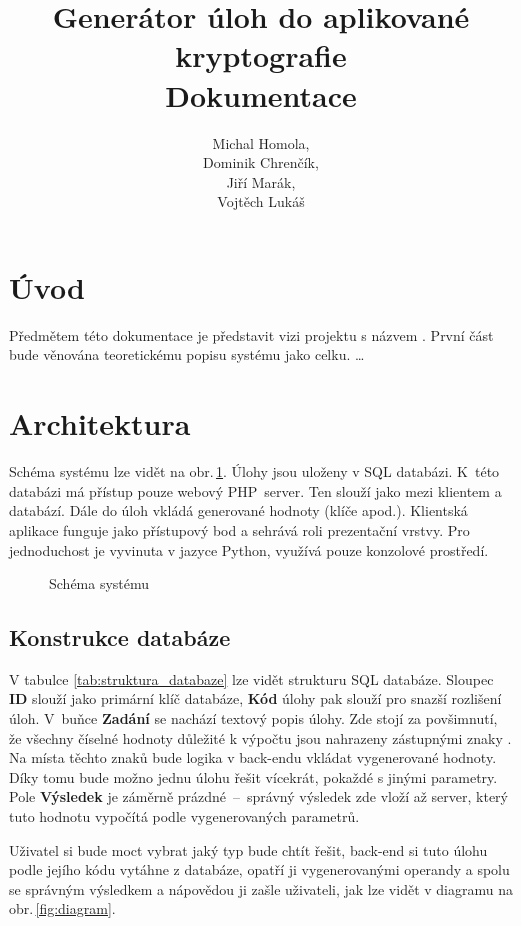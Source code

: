 \documentclass[titlepage]{article}
\title{Generátor úloh do aplikované kryptografie\\Dokumentace}
\author{Michal Homola,\\Dominik Chrenčík,\\Jiří Marák,\\Vojtěch Lukáš}
\begin{document}
\maketitle

\tableofcontents

\section*{Úvod}
Předmětem této dokumentace je představit vizi projektu s názvem . První část bude věnována teoretickému popisu systému jako celku. \dots

\section{Architektura}
Schéma systému lze vidět na obr.\,\ref{fig:sys}. Úlohy jsou uloženy v SQL databázi. K~této databázi má přístup pouze webový PHP~server. Ten slouží jako  mezi klientem a databází. Dále do úloh vkládá generované hodnoty (klíče apod.).
Klientská aplikace funguje jako přístupový bod a sehrává roli prezentační vrstvy. Pro jednoduchost je vyvinuta v jazyce Python, využívá pouze konzolové pro\-středí. 
\begin{figure}[h!]
    \centering
        
    \caption{Schéma systému}
    \label{fig:sys}
\end{figure}

\subsection{Konstrukce databáze}
V tabulce \ref{tab:struktura_databaze} lze vidět strukturu SQL databáze. 
Sloupec \textbf{ID} slouží jako primární klíč databáze, \textbf{Kód} úlohy pak slouží pro snazší rozlišení úloh. V~buňce \textbf{Zadání} se nachází textový popis úlohy. Zde stojí za povšimnutí, že všechny číselné hodnoty důležité k výpočtu jsou nahrazeny zástupnými znaky . 
Na místa těchto znaků bude logika v back-endu vkládat vygenerované hodnoty. Díky tomu bude možno jednu úlohu řešit vícekrát, po\-kaž\-dé s jinými parametry. 
Pole \textbf{Výsledek} je záměrně prázdné~--~správný výsledek zde vloží až server, který tuto hodnotu vypočítá podle vygenerovaných parametrů. 

Uživatel si bude moct vybrat jaký typ bude chtít řešit, back-end si tuto úlohu podle jejího kódu vytáhne z databáze, opatří ji vygenerovanými operandy a spolu se správným výsledkem a nápovědou ji zašle uživateli, jak lze vidět v diagramu na obr.\,\ref*{fig:diagram}.
\end{document}
